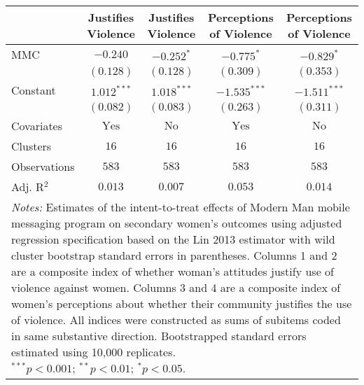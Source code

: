 
\begin{tabular}{l c c c c}
\toprule
 & Justifies Violence & Justifies Violence & Perceptions of Violence & Perceptions of Violence \\
\midrule
MMC          & $-0.240$       & $-0.252^{*}$  & $-0.775^{*}$   & $-0.829^{*}$   \\
             & $(0.128)$      & $(0.128)$     & $(0.309)$      & $(0.353)$      \\
Constant     & $1.012^{***}$  & $1.018^{***}$ & $-1.535^{***}$ & $-1.511^{***}$ \\
             & $(0.082)$      & $(0.083)$     & $(0.263)$      & $(0.311)$      \\
\midrule
Covariates   & $\textrm{Yes}$ & $\textrm{No}$ & $\textrm{Yes}$ & $\textrm{No}$  \\
Clusters     & $16$           & $16$          & $16$           & $16$           \\
Observations & $583$          & $583$         & $583$          & $583$          \\
Adj. R$^2$   & $0.013$        & $0.007$       & $0.053$        & $0.014$        \\
\bottomrule
\multicolumn{5}{l}{\scriptsize{\parbox{\linewidth}{\vspace{2pt}
       \textit{Notes:} Estimates of the intent-to-treat effects of Modern Man mobile
       messaging program on secondary women's outcomes using adjusted regression
       specification based on the Lin 2013 estimator with wild cluster bootstrap
       standard errors in parentheses. Columns 1 and 2 are a composite index of
       whether woman's attitudes justify use of violence against women. Columns 3 and 4
       are a composite index of women's perceptions about whether their community justifies
       the use of violence. All indices were constructed as sums of subitems coded in
       same substantive direction. Bootstrapped standard errors estimated using 10,000 replicates. \\ $^{***}p<0.001$; $^{**}p<0.01$; $^{*}p<0.05$.}}}
\end{tabular}
